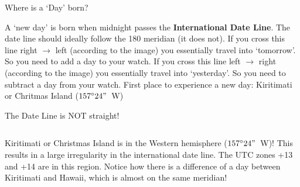 {%
\begin{myFrame}{Where is a `Day' born?}{}
\smallskip
{}
\setCol
\begin{itemize}
\col A `new day' is born when midnight passes the \textbf{International Date Line}.
\col The date line should ideally follow the 180\s{$\circ$} meridian (it does not). 
\col If you cross this line right $\rightarrow$ left (according to the image) you essentially travel into `tomorrow'. So you need to add a day to your watch.
\col If you cross this line left $\rightarrow$ right  (according to the image) you essentially travel into `yesterday'. So you need to subtract a day from your watch.
\col First place to experience a new day: Kiritimati or Chritmas Island ($157^\circ24"$~\textcolor{myRed}{W})
\end{itemize}

\end{myFrame}

\begin{myFrame}{The Date Line is NOT straight!}{}
\bigskip
\begin{columns}
\setCol
\begin{itemize}\small
\col Kiritimati or Christmas Island is in the Western hemisphere ($157^\circ24"$~\textcolor{myRed}{W})!
\col This results in a large irregularity in the international date line.
\col The UTC zones +13 and +14 are in this region.
\col Notice how there is a difference of a day between Kiritimati and Hawaii, which is almost on the same meridian!
\end{itemize}
\end{columns}
\end{myFrame}
}
